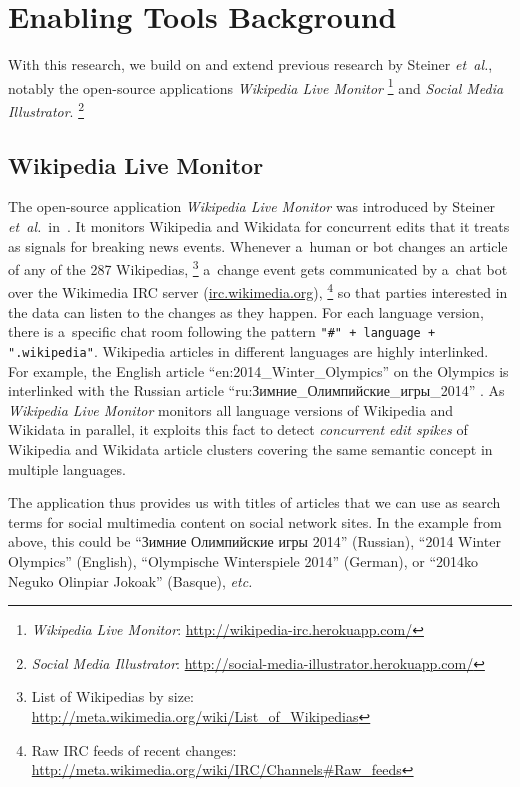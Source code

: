\documentclass{sig-alternate}
\newcommand{\inlinelistingsize}{\fontsize{8pt}{11pt}}
\let\oldurl\url
\renewcommand{\url}[1]{\inlinelistingsize\oldurl{#1}}
\begin{document}
\section{Enabling Tools Background}
\label{sec:enabling-tools-background}
\selectfont

With this research, we build on and extend previous research
by Steiner \emph{et~al.}, notably
the open-source applications \emph{Wikipedia Live Monitor}%
\footnote{\emph{Wikipedia Live Monitor}:
\url{http://wikipedia-irc.herokuapp.com/}}
and \emph{Social Media Illustrator}.%
\footnote{\emph{Social Media Illustrator}:
\url{http://social-media-illustrator.herokuapp.com/}}

\subsection{Wikipedia Live Monitor}

The open-source application \emph{Wikipedia Live Monitor}
was introduced by Steiner \emph{et~al.}\
in~\cite{steiner2013mjnomore}.
It monitors Wikipedia and Wikidata for concurrent edits
that it treats as signals for breaking news events.
Whenever a~human or bot changes an article
of any of the 287 Wikipedias,%
\footnote{List of Wikipedias by size:
\url{http://meta.wikimedia.org/wiki/List_of_Wikipedias}}
a~change event gets communicated by a~chat bot
over the Wikimedia IRC server (\url{irc.wikimedia.org}),%
\footnote{Raw IRC feeds of recent changes:
\url{http://meta.wikimedia.org/wiki/IRC/Channels\#Raw_feeds}}
so that parties interested in the data
can listen to the changes as they happen.
For each language version, there is
a~specific chat room following the pattern
\texttt{"\#" + language + ".wikipedia"}.
Wikipedia articles in different languages are highly interlinked.
For example, the English article
``en:2014\_Winter\_Olympics''
on the Olympics is interlinked with the Russian article
\selectfont%
``ru:Зимние\_Олимпийские\_игры\_2014''%
\selectfont.
As \emph{Wikipedia Live Monitor} monitors all language versions
of Wikipedia and Wikidata in parallel,
it exploits this fact to detect \emph{concurrent edit spikes}
of Wikipedia and Wikidata article clusters covering
the same semantic concept in multiple languages.

The application thus provides us with titles of articles
that we can use as search terms for social multimedia content
on social network sites.
In the example from above, this could be
\selectfont%
``Зимние Олимпийские игры 2014''%
\selectfont (Russian),
``2014 Winter Olympics'' (English),
``Olympische Winterspiele 2014'' (German),
or ``2014ko Neguko Olinpiar Jokoak'' (Basque), \emph{etc.}
\end{document}
